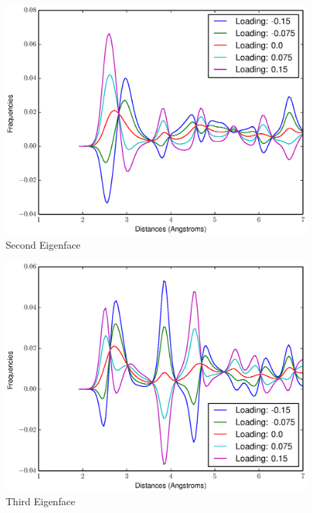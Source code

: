 \documentclass[12pt,letterpaper]{article}
\begin{document}
\begin{figure}[ht]
  \begin{center}
    \includegraphics[scale=0.8]{figs/eigenface2.eps}
    \caption{Second Eigenface}
  \end{center}
\end{figure}

\begin{figure}[ht]
  \begin{center}
    \includegraphics[scale=0.8]{figs/eigenface3.eps}
    \caption{Third Eigenface}
  \end{center}
\end{figure}
\clearpage
\end{document}
